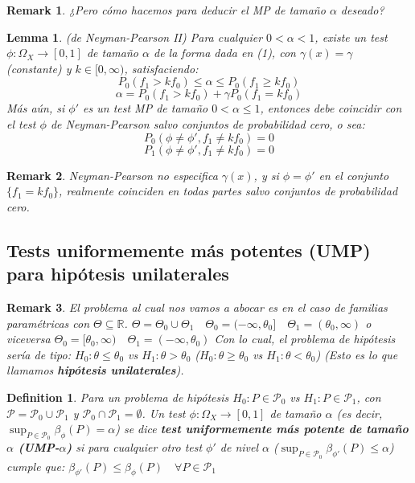 \documentclass{article}
\theoremstyle{remarkstyle}
\newtheorem*{remark}{Remark}
\theoremstyle{examplestyle}
\theoremstyle{definitionstyle}
\newtheorem*{definition}{Definition}
\theoremstyle{lemmastyle}
\newtheorem*{lemma}{Lemma}
\theoremstyle{theoremstyle}
\begin{document}
\begin{remark}
¿Pero cómo hacemos para deducir el MP de tamaño $\alpha$ deseado?
\end{remark}

\begin{lemma} (de Neyman-Pearson II)
Para cualquier $0 < \alpha < 1$, existe un test $\phi: \Omega_X \to [0,1]$ de tamaño $\alpha$ de la forma dada en (1), con $\gamma(x) = \gamma$ (constante) y $k \in [0, \infty)$, satisfaciendo:
\[ P_0(f_1 > k f_0) \le \alpha \le P_0(f_1 \ge k f_0) \]
\[ \alpha = P_0(f_1 > k f_0) + \gamma P_0(f_1 = k f_0) \]
Más aún, si $\phi'$ es un test MP de tamaño $0 < \alpha \le 1$, entonces debe coincidir con el test $\phi$ de Neyman-Pearson salvo conjuntos de probabilidad cero, o sea:
\[ P_0(\phi \neq \phi', f_1 \neq k f_0) = 0 \]
\[ P_1(\phi \neq \phi', f_1 \neq k f_0) = 0 \]
\end{lemma}

\begin{remark}
Neyman-Pearson no especifica $\gamma(x)$, y si $\phi = \phi'$ en el conjunto $\{f_1 = k f_0\}$, realmente coinciden en todas partes salvo conjuntos de probabilidad cero.
\end{remark}

\subsection*{Tests uniformemente más potentes (UMP) para hipótesis unilaterales}

\begin{remark}
El problema al cual nos vamos a abocar es en el caso de familias paramétricas con $\Theta \subseteq \mathbb{R}$.
$\Theta = \Theta_0 \cup \Theta_1 \quad \Theta_0 = (-\infty, \theta_0] \quad \Theta_1 = (\theta_0, \infty)$
o viceversa
$\Theta_0 = [\theta_0, \infty) \quad \Theta_1 = (-\infty, \theta_0)$
Con lo cual, el problema de hipótesis sería de tipo:
$H_0: \theta \le \theta_0$ vs $H_1: \theta > \theta_0$
($H_0: \theta \ge \theta_0$ vs $H_1: \theta < \theta_0$)
(Esto es lo que llamamos \textbf{hipótesis unilaterales}).
\end{remark}

\begin{definition}
Para un problema de hipótesis $H_0: P \in \mathcal{P}_0$ vs $H_1: P \in \mathcal{P}_1$, con $\mathcal{P} = \mathcal{P}_0 \cup \mathcal{P}_1$ y $\mathcal{P}_0 \cap \mathcal{P}_1 = \emptyset$. Un test $\phi: \Omega_X \to [0,1]$ de tamaño $\alpha$ (es decir, $\sup_{P \in \mathcal{P}_0} \beta_\phi(P) = \alpha$) se dice \textbf{test uniformemente más potente de tamaño $\alpha$ (UMP-$\alpha$)} si para cualquier otro test $\phi'$ de nivel $\alpha$ ($\sup_{P \in \mathcal{P}_0} \beta_{\phi'}(P) \le \alpha$) cumple que: 
$\beta_{\phi'}(P) \le \beta_\phi(P) \quad \forall P \in \mathcal{P}_1$
\end{definition}
\end{document}

